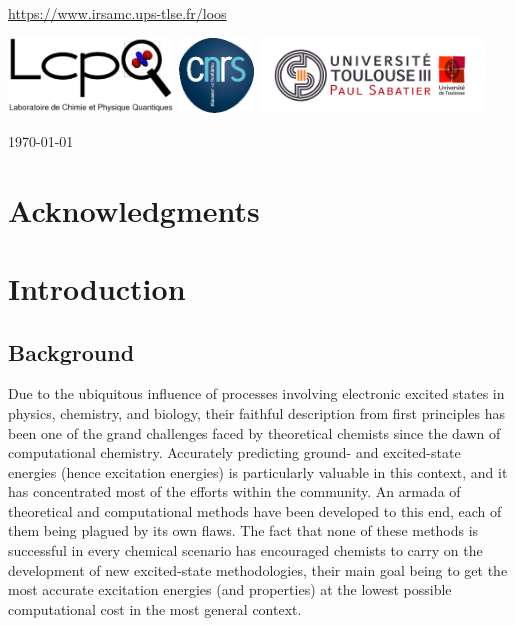 \documentclass[11pt,a4paper]{article}
\begin{document}
\begin{center}
{\url{https://www.irsamc.ups-tlse.fr/loos}
} %

\vspace{0.5cm}
\includegraphics[height=2cm]{LCPQ_logo.pdf} \hfill \includegraphics[height=2cm]{LogoCNRS.eps} \hfill \includegraphics[height=2cm]{UPS_logo.jpg}

\end{center}

\vfill
\hfill \today

\newpage
\thispagestyle{empty}

\setlength{\parindent}{17pt}

\section*{Acknowledgments}

\tableofcontents

\newpage
\setcounter{page}{1}

\section{Introduction}

\subsection{Background}

Due to the ubiquitous influence of processes involving electronic excited states in physics, chemistry, and biology, their faithful description from first principles has been one of the grand challenges faced by theoretical chemists since the dawn of computational chemistry. 
Accurately predicting ground- and excited-state energies (hence excitation energies) is particularly valuable in this context, and it has concentrated most of the efforts within the community.
An armada of theoretical and computational methods have been developed to this end, each of them being plagued by its own flaws. 
The fact that none of these methods is successful in every chemical scenario has encouraged chemists to carry on the development of new excited-state methodologies, their main goal being to get the most accurate excitation energies (and properties) at the lowest possible computational cost in the most general context.
\end{document}
